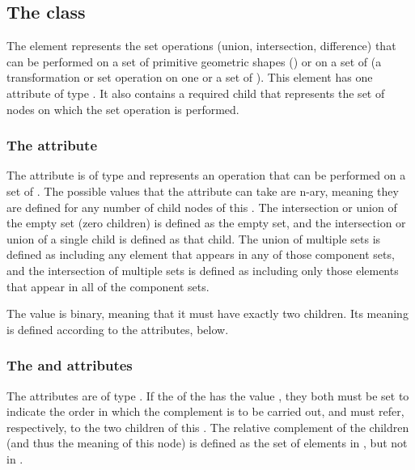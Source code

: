 \subsection{The  class}
\label{csgsetoperator-class}
The \CSGSetOperator element represents the set operations (union, intersection, difference) that can be performed on a set of primitive geometric shapes (\CSGPrimitives) or on a set of \CSGNodes (a transformation or set operation on one or a set of \CSGPrimitives). This element has one attribute of type . It also contains a required child \ListOfCSGNodes that represents the set of nodes on which the set operation is performed.

\subsubsection{The \fixttspace{} attribute}
The  attribute is of type  and represents an operation that can be performed on a set of \CSGNodes. The possible values that the  attribute can take are  n-ary, meaning they are defined for any number of child nodes of this \CSGSetOperator.  The intersection or union of the empty set (zero children) is defined as the empty set, and the intersection or union of a single child is defined as that child.  The union of multiple sets is defined as including any element that appears in any of those component sets, and the intersection of multiple sets is defined as including only those elements that appear in all of the component sets.

The value  is binary, meaning that it must have exactly two children.  Its meaning is defined according to the  attributes, below.

\subsubsection{The \fixttspace{} and  attributes}
The  attributes are of type .  If the  of the \CSGSetOperator has the value , they both must be set to indicate the order in which the complement is to be carried out, and must refer, respectively, to the two  children of this \CSGSetOperator.  The relative complement of the children (and thus the meaning of this node) is defined as the set of elements in , but not in .  

